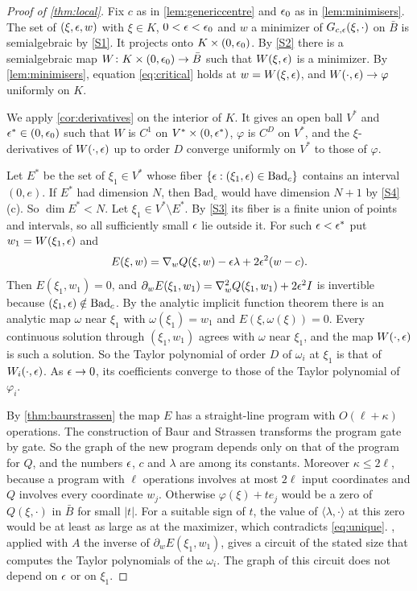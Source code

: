 \begin{proof}[Proof of \cref{thm:local}]
Fix $c$ as in \cref{lem:genericcentre} and $\epsilon_0$ as in \cref{lem:minimisers}. The set of $(\xi,\epsilon,w)$ with $\xi\in K$, $0<\epsilon<\epsilon_0$ and $w$ a minimizer of $G_{c,\epsilon}(\xi,\cdot)$ on $\bar B$ is semialgebraic by \ref{S1}. It projects onto $K\times(0,\epsilon_0)$. By \ref{S2} there is a semialgebraic map $W\colon K\times(0,\epsilon_0)\to\bar B$ such that $W(\xi,\epsilon)$ is a minimizer. By \cref{lem:minimisers}, equation \eqref{eq:critical} holds at $w=W(\xi,\epsilon)$, and $W(\cdot,\epsilon)\to\varphi$ uniformly on $K$.

We apply \cref{cor:derivatives} on the interior of $K$. It gives an open ball $V^*$ and $\epsilon^*\in(0,\epsilon_0)$ such that $W$ is $C^1$ on $V^*\times(0,\epsilon^*)$, $\varphi$ is $C^D$ on $V^*$, and the $\xi$-derivatives of $W(\cdot,\epsilon)$ up to order $D$ converge uniformly on $V^*$ to those of $\varphi$.

Let $E^*$ be the set of $\xi_1\in V^*$ whose fiber $\{\epsilon:(\xi_1,\epsilon)\in\mathrm{Bad}_c\}$ contains an interval $(0,e)$. If $E^*$ had dimension $N$, then $\mathrm{Bad}_c$ would have dimension $N+1$ by \ref{S4}(c). So $\dim E^*<N$. Let $\xi_1\in V^*\setminus E^*$. By \ref{S3} its fiber is a finite union of points and intervals, so all sufficiently small $\epsilon$ lie outside it. For such $\epsilon<\epsilon^*$ put $w_1=W(\xi_1,\epsilon)$ and
\[
E(\xi,w)=\nabla_wQ(\xi,w)-\epsilon\lambda+2\epsilon^2(w-c).
\]
Then $E(\xi_1,w_1)=0$, and $\partial_wE(\xi_1,w_1)=\nabla_w^2Q(\xi_1,w_1)+2\epsilon^2I$ is invertible because $(\xi_1,\epsilon)\notin\mathrm{Bad}_c$. By the analytic implicit function theorem there is an analytic map $\omega$ near $\xi_1$ with $\omega(\xi_1)=w_1$ and $E(\xi,\omega(\xi))=0$. Every continuous solution through $(\xi_1,w_1)$ agrees with $\omega$ near $\xi_1$, and the map $W(\cdot,\epsilon)$ is such a solution. So the Taylor polynomial of order $D$ of $\omega_i$ at $\xi_1$ is that of $W_i(\cdot,\epsilon)$. As $\epsilon\to0$, its coefficients converge to those of the Taylor polynomial of $\varphi_i$.

By \cref{thm:baurstrassen} the map $E$ has a straight-line program with $O(\ell+\kappa)$ operations. The construction of Baur and Strassen transforms the program gate by gate. So the graph of the new program depends only on that of the program for $Q$, and the numbers $\epsilon$, $c$ and $\lambda$ are among its constants. Moreover $\kappa\le2\ell$, because a program with $\ell$ operations involves at most $2\ell$ input coordinates and $Q$ involves every coordinate $w_j$. Otherwise $\varphi(\xi)+te_j$ would be a zero of $Q(\xi,\cdot)$ in $\bar B$ for small $|t|$. For a suitable sign of $t$, the value of $\langle\lambda,\cdot\rangle$ at this zero would be at least as large as at the maximizer, which contradicts \eqref{eq:unique}. , applied with $A$ the inverse of $\partial_wE(\xi_1,w_1)$, gives a circuit of the stated size that computes the Taylor polynomials of the $\omega_i$. The graph of this circuit does not depend on $\epsilon$ or on $\xi_1$.
\end{proof}

